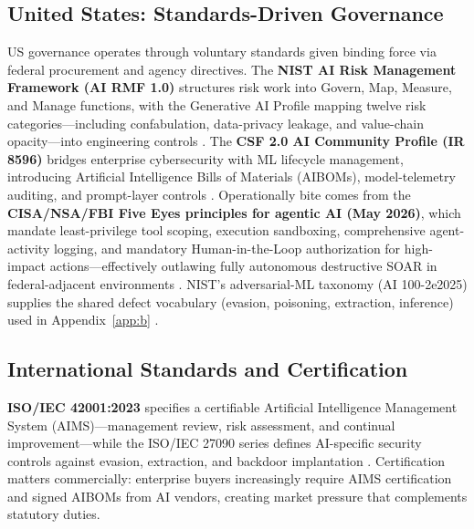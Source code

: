 \documentclass[conference,10pt,twocolumn,a4paper]{IEEEtran}
\begin{document}
\subsection{United States: Standards-Driven Governance}
US governance operates through voluntary standards given binding force via federal procurement and agency directives. The \textbf{NIST AI Risk Management Framework (AI RMF 1.0)} structures risk work into Govern, Map, Measure, and Manage functions, with the Generative AI Profile mapping twelve risk categories---including confabulation, data-privacy leakage, and value-chain opacity---into engineering controls \cite{nist_sp_1270_ai_rmf}. The \textbf{CSF 2.0 AI Community Profile (IR 8596)} bridges enterprise cybersecurity with ML lifecycle management, introducing Artificial Intelligence Bills of Materials (AIBOMs), model-telemetry auditing, and prompt-layer controls \cite{nist_csf_ai_2026}. Operationally bite comes from the \textbf{CISA/NSA/FBI Five Eyes principles for agentic AI (May 2026)}, which mandate least-privilege tool scoping, execution sandboxing, comprehensive agent-activity logging, and mandatory Human-in-the-Loop authorization for high-impact actions---effectively outlawing fully autonomous destructive SOAR in federal-adjacent environments \cite{cisa_agentic_ai_2026}. NIST's adversarial-ML taxonomy (AI 100-2e2025) supplies the shared defect vocabulary (evasion, poisoning, extraction, inference) used in Appendix~\ref{app:b} \cite{nist_sp_ai_100_2e2025}.

\subsection{International Standards and Certification}
\textbf{ISO/IEC 42001:2023} specifies a certifiable Artificial Intelligence Management System (AIMS)---management review, risk assessment, and continual improvement---while the ISO/IEC 27090 series defines AI-specific security controls against evasion, extraction, and backdoor implantation \cite{nist_csf_ai_2026}. Certification matters commercially: enterprise buyers increasingly require AIMS certification and signed AIBOMs from AI vendors, creating market pressure that complements statutory duties.
\end{document}
